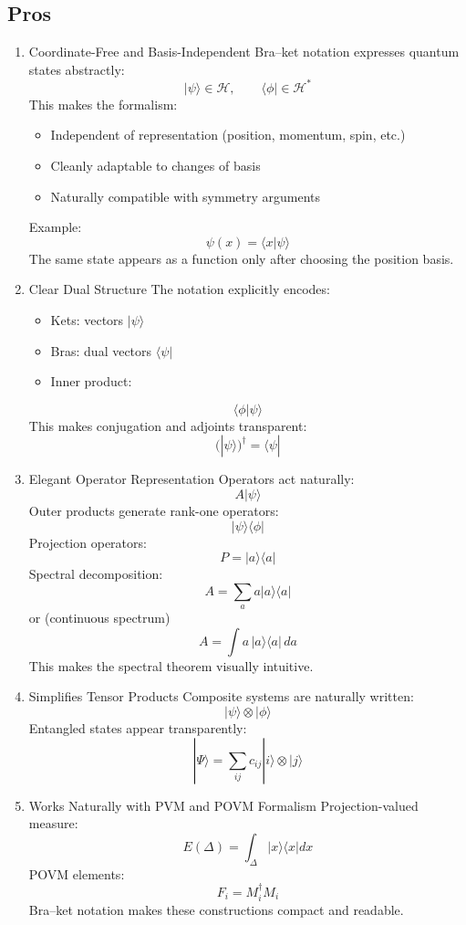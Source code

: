 \documentclass[12pt]{article}
\begin{document}
\subsection{ Pros}\label{pros}
\begin{enumerate}
   \item
 Coordinate-Free and Basis-Independent
Bra--ket notation expresses quantum states abstractly:
\[|\psi\rangle \in \mathcal{H}, \qquad \langle \phi| \in \mathcal{H}^*\]
This makes the formalism:
\begin{itemize}
\item
  Independent of representation (position, momentum, spin, etc.)
\item
  Cleanly adaptable to changes of basis
\item
  Naturally compatible with symmetry arguments
\end{itemize}
Example:
\[\psi(x) = \langle x|\psi\rangle\]
The same state appears as a function only after choosing the position
basis.
\item
 Clear Dual Structure
  The notation explicitly encodes:
\begin{itemize}
\item
  Kets: vectors \(|\psi\rangle\)
\item
  Bras: dual vectors \(\langle\psi|\)
\item
  Inner product:
\end{itemize}
\[\langle \phi | \psi \rangle\]
This makes conjugation and adjoints transparent:
\[(|\psi\rangle)^\dagger = \langle \psi|\]
\item
Elegant Operator Representation
Operators act naturally:
\[A|\psi\rangle\]
Outer products generate rank-one operators:
\[|\psi\rangle\langle\phi|\]
Projection operators:
\[P = |a\rangle\langle a|\]
Spectral decomposition:
\[A = \sum_a a |a\rangle\langle a|\]
or (continuous spectrum)
\[A = \int a\, |a\rangle\langle a|\, da\]
This makes the spectral theorem visually intuitive.
\item
Simplifies Tensor Products
Composite systems are naturally written:
\[|\psi\rangle \otimes |\phi\rangle\]
Entangled states appear transparently:
\[|\Psi\rangle = \sum_{ij} c_{ij} |i\rangle \otimes |j\rangle\]
\item
Works Naturally with PVM and POVM Formalism
Projection-valued measure:
\[E(\Delta) = \int_\Delta |x\rangle\langle x| dx\]
POVM elements:
\[F_i = M_i^\dagger M_i\]
Bra--ket notation makes these constructions compact and readable.
\end{enumerate}
\end{document}
